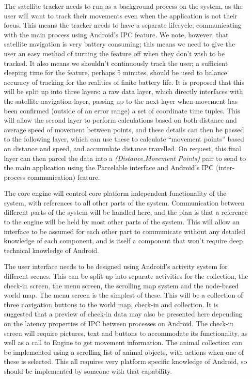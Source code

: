 \documentclass[]{report}
\begin{document}
The satellite tracker needs to run as a background process on the system, as the user will want to track their movements even when the application is not their focus. This means the tracker needs to have a separate lifecycle, communicating with the main process using Android's IPC feature. We note, however, that satellite navigation is very battery consuming; this means we need to give the user an easy method of turning the feature off when they don't wish to be tracked. It also means we shouldn't continuously track the user; a sufficient sleeping time for the feature, perhaps 5 minutes, should be used to balance accuracy of tracking for the realities of finite battery life. It is proposed that this will be split up into three layers: a raw data layer, which directly interfaces with the satellite navigation layer, passing up to the next layer when movement has been confirmed (outside of an error range) a set of coordinate time tuples. This will allow the second layer to perform calculations based on both distance and average speed of movement between points, and these details can then be passed to the following layer, which can use these to calculate ``movement points'' based on distance and speed, and accumulate distance travelled. On request, this final layer can then parcel the data into a \textit{(Distance,Movement Points)} pair to send to the main application using the Parcelable interface and Android's IPC (inter-process communication) feature.

The core engine will control core platform independent functionality of the system, with references to all other parts of the system. Communication between different parts of the system will be handled here, and the plan is that a reference to the engine will be held by most other parts of the system. This will allow an interface to be assumed for each other part to communicate without any detailed knowledge of each component, and is itself a component that won't require deep technical knowledge of Android.

The user interface needs to be designed using Android's activity system for different scenes. This can be split up into separate activities for the collection, the check-in screen, the menu screen, the scrolling map system and the node-based world map. The menu screen is the simplest of these. This will be a collection of three navigation buttons to the world map, check-in and collection. It is suggested that a preview of check-in data may also be presented here depending on the latency properties of IPC between processes on Android. The check-in screen will require pictures, text and buttons to accommodate its functionality, as well as a call to Engine to get movement information. The animal collection can be implemented using a scrolling list of animal objects, with actions when one of these is selected. This all requires very platform specific knowledge of Android, so should be implemented by someone with that capability.
\end{document}
